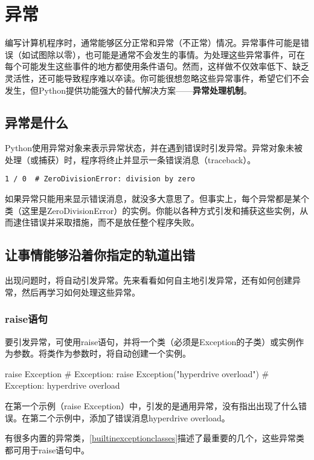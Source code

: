 \chapter{异常\label{chapter08}}
编写计算机程序时，通常能够区分正常和异常（不正常）情况。异常事件可能是错误（如试图除以零），也可能是通常不会发生的事情。为处理这些异常事件，可在每个可能发生这些事件的地方都使用条件语句。然而，这样做不仅效率低下、缺乏灵活性，还可能导致程序难以卒读。你可能很想忽略这些异常事件，希望它们不会发生，但Python提供功能强大的替代解决方案——\textbf{异常处理机制}。
\section{异常是什么}
Python使用异常对象来表示异常状态，并在遇到错误时引发异常。异常对象未被处理（或捕获）时，程序将终止并显示一条错误消息（traceback）。

\verb|1 / 0  # ZeroDivisionError: division by zero|

如果异常只能用来显示错误消息，就没多大意思了。但事实上，每个异常都是某个类（这里是ZeroDivisionError）的实例。你能以各种方式引发和捕获这些实例，从而逮住错误并采取措施，而不是放任整个程序失败。
\section{让事情能够沿着你指定的轨道出错}
出现问题时，将自动引发异常。先来看看如何自主地引发异常，还有如何创建异常，然后再学习如何处理这些异常。
\subsection{raise语句}
要引发异常，可使用raise语句，并将一个类（必须是Exception的子类）或实例作为参数。将类作为参数时，将自动创建一个实例。

\begin{pyc}
raise Exception  # Exception:
raise Exception("hyperdrive overload")  # Exception: hyperdrive overload
\end{pyc}
在第一个示例（raise Exception）中，引发的是通用异常，没有指出出现了什么错误。在第二个示例中，添加了错误消息hyperdrive overload。

有很多内置的异常类，\autoref{builtinexceptionclasses}描述了最重要的几个，这些异常类都可用于raise语句中。

